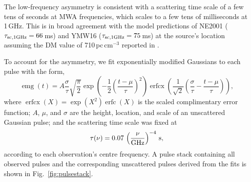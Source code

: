 \documentclass[fleqn,usenatbib]{mnras}
\DeclareMathOperator{\erfcx}{erfcx}
\DeclareMathOperator{\erfc}{erfc}
\DeclareMathOperator{\emg}{emg}
\newcommand{\Fig}{Fig.}
\begin{document}
The low-frequency asymmetry is consistent with a scattering time scale of a few tens of seconds at MWA frequencies, which scales to a few tens of milliseconds at 1\,GHz.
This is in broad agreement with the model predictions of NE2001 ($\tau_{\rm sc,1GHz} = 66\,$ms) and YMW16 ($\tau_{\rm sc,1 GHz} = 75\,$ms) at the source's location assuming the DM value of 710\,pc\,cm$^{-3}$ reported in .

To account for the asymmetry, we fit exponentially modified Gaussians to each pulse with the form,
\begin{equation}
  \emg(t) = A \frac{\sigma}{\tau}\sqrt{\frac{\pi}{2}}
    \exp\left(-\frac12 \left( \frac{t - \mu}{\tau} \right)^2 \right)  \erfcx \left(\frac{1}{\sqrt{2}} \left(\frac{\sigma}{\tau} - \frac{t - \mu}{\tau} \right) \right),
  \label{eqn:emg}
\end{equation}
where $\erfcx(X) = \exp(X^2) \erfc(X)$ is the scaled complimentary error function; $A$, $\mu$, and $\sigma$ are the height, location, and scale of an unscattered Gaussian pulse; and the scattering time scale was fixed at
\begin{equation}
      \tau(\nu) = 0.07\, \left(\frac{\nu}{\rm GHz}\right)^{-4} \, {\rm s},
\end{equation}
according to each observation's centre frequency.
A pulse stack containing all observed pulses and the corresponding unscattered pulses derived from the fits is shown in \Fig~\ref{fig:pulsestack}.
\end{document}
